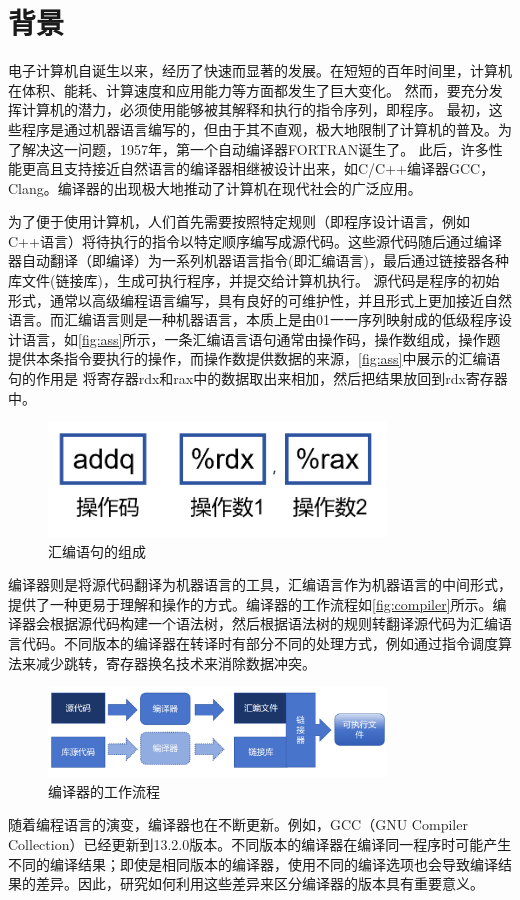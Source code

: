 \section{背景}
电子计算机自诞生以来，经历了快速而显著的发展。在短短的百年时间里，计算机在体积、能耗、计算速度和应用能力等方面都发生了巨大变化。
然而，要充分发挥计算机的潜力，必须使用能够被其解释和执行的指令序列，即程序。
最初，这些程序是通过机器语言编写的，但由于其不直观，极大地限制了计算机的普及。为了解决这一问题，1957年，第一个自动编译器FORTRAN诞生了。
此后，许多性能更高且支持接近自然语言的编译器相继被设计出来，如C/C++编译器GCC，Clang。编译器的出现极大地推动了计算机在现代社会的广泛应用。

\par
为了便于使用计算机，人们首先需要按照特定规则（即程序设计语言，例如C++语言）将待执行的指令以特定顺序编写成源代码。这些源代码随后通过编译器自动翻译（即编译）为一系列机器语言指令(即汇编语言)，最后通过链接器各种库文件(链接库)，生成可执行程序，并提交给计算机执行。
源代码是程序的初始形式，通常以高级编程语言编写，具有良好的可维护性，并且形式上更加接近自然语言。而汇编语言则是一种机器语言，本质上是由01一一序列映射成的低级程序设计语言，如\autoref{fig:ass}所示，一条汇编语言语句通常由操作码，操作数组成，操作题提供本条指令要执行的操作，而操作数提供数据的来源，\autoref{fig:ass}中展示的汇编语句的作用是 将寄存器rdx和rax中的数据取出来相加，然后把结果放回到rdx寄存器中。
\begin{figure}[H]
    \centering
    \includegraphics[width=0.8\textwidth]{figures/ass.png}
    \caption{汇编语句的组成}
    \label{fig:ass}
\end{figure}
编译器则是将源代码翻译为机器语言的工具，汇编语言作为机器语言的中间形式，提供了一种更易于理解和操作的方式。编译器的工作流程如\autoref{fig:compiler}所示。编译器会根据源代码构建一个语法树，然后根据语法树的规则转翻译源代码为汇编语言代码。不同版本的编译器在转译时有部分不同的处理方式，例如通过指令调度算法来减少跳转，寄存器换名技术来消除数据冲突。
\begin{figure}
    \centering
    \includegraphics[width=0.8\textwidth]{figures/compiler.png}
    \caption{编译器的工作流程}
    \label{fig:compiler}
\end{figure}
随着编程语言的演变，编译器也在不断更新。例如，GCC（GNU Compiler Collection）已经更新到13.2.0版本。不同版本的编译器在编译同一程序时可能产生不同的编译结果；即使是相同版本的编译器，使用不同的编译选项也会导致编译结果的差异。因此，研究如何利用这些差异来区分编译器的版本具有重要意义。
\par
